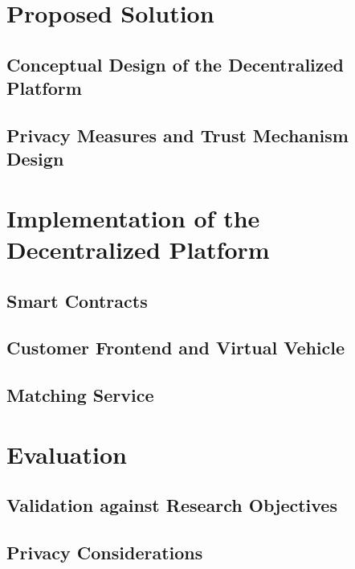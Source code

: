 \documentclass[
  a4paper,  %
  twoside,  %
  bibliography=totoc,
  headsepline,
  cleardoublepage=empty,
  parskip=half,
  draft=false
]{scrbook}
\begin{document}
\chapter{Proposed Solution}\label{chap:ProposedSolution}

\section{Conceptual Design of the Decentralized Platform}\label{sec:DesignOfThePlatform}

\section{Privacy Measures and Trust Mechanism Design}\label{sec:PrivacyAndTrustMechanism}


\chapter{Implementation of the Decentralized Platform}\label{chap:PrototypeImplementation}

\section{Smart Contracts}\label{sec:SmartContracts}

\section{Customer Frontend and Virtual Vehicle}\label{sec:Frontend}

\section{Matching Service}
\label{sec:Matching Service}

\chapter{Evaluation}

\section{Validation against Research Objectives}

\section{Privacy Considerations}

\end{document}
